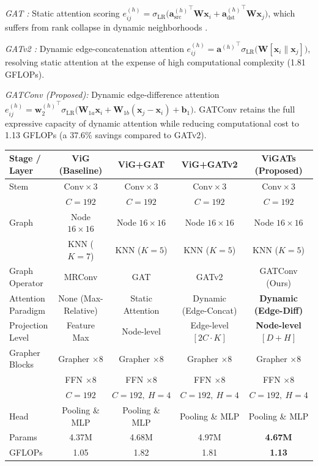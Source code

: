 \documentclass[]{interact}
\theoremstyle{plain}
\theoremstyle{definition}
\theoremstyle{remark}
\begin{document}
\textit{GAT \citep{velickovic2018graph}:} Static attention scoring $e_{ij}^{(h)} = \sigma_{\text{LR}}\!\Big({\mathbf{a}_{\text{src}}^{(h)}}^\top \mathbf{W}\mathbf{x}_i + {\mathbf{a}_{\text{dst}}^{(h)}}^\top \mathbf{W}\mathbf{x}_j\Big)$, which suffers from rank collapse in dynamic neighborhoods \citep{brody2022gat}.

\textit{GATv2 \citep{brody2022gat}:} Dynamic edge-concatenation attention $e_{ij}^{(h)} = {\mathbf{a}^{(h)}}^\top \sigma_{\text{LR}}\!\Big(\mathbf{W}[\mathbf{x}_i \parallel \mathbf{x}_j]\Big)$, resolving static attention at the expense of high computational complexity (1.81 GFLOPs).

\textit{GATConv (Proposed):} Dynamic edge-difference attention $e_{ij}^{(h)} = {\mathbf{w}_2^{(h)}}^\top \sigma_{\text{LR}}\!\Big(\mathbf{W}_{1a}\mathbf{x}_i + \mathbf{W}_{1b}(\mathbf{x}_j - \mathbf{x}_i) + \mathbf{b}_1\Big)$. GATConv retains the full expressive capacity of dynamic attention while reducing computational cost to 1.13 GFLOPs (a $37.6\%$ savings compared to GATv2).

\begin{table}[H]
\centering
\small
{}
{\begin{tabular}{lcccc} \toprule
\textbf{Stage / Layer} & \textbf{ViG (Baseline)} & \textbf{ViG+GAT} & \textbf{ViG+GATv2} & ViGATs (Proposed) \\ \midrule
Stem & $\text{Conv} \times 3$ & $\text{Conv} \times 3$ & $\text{Conv} \times 3$ & $\text{Conv} \times 3$ \\
     & $C = 192$ & $C = 192$ & $C = 192$ & $C = 192$ \\ \midrule
Graph & Node $16 \times 16$ & Node $16 \times 16$ & Node $16 \times 16$ & Node $16 \times 16$ \\
      & KNN ($K=7$) & KNN ($K=5$) & KNN ($K=5$) & KNN ($K=5$) \\ \midrule
Graph Operator & MRConv \citep{han2022vision} & GAT \citep{velickovic2018graph} & GATv2 \citep{brody2022gat} & GATConv (Ours) \\
Attention Paradigm & None (Max-Relative) & Static Attention & Dynamic (Edge-Concat) & \textbf{Dynamic (Edge-Diff)} \\
Projection Level & Feature Max & Node-level & Edge-level $[2C \cdot K]$ & \textbf{Node-level $[D+H]$} \\ \midrule
Grapher Blocks & Grapher $\times 8$ & Grapher $\times 8$ & Grapher $\times 8$ & Grapher $\times 8$ \\
               & FFN $\times 8$ & FFN $\times 8$ & FFN $\times 8$ & FFN $\times 8$ \\
               & $C = 192$ & $C = 192,\ H = 4$ & $C = 192,\ H = 4$ & $C = 192,\ H = 4$ \\ \midrule
Head & Pooling \& MLP & Pooling \& MLP & Pooling \& MLP & Pooling \& MLP \\ \midrule
Params & 4.37M & 4.68M & 4.97M & \textbf{4.67M} \\
GFLOPs & 1.05 & 1.82 & 1.81 & \textbf{1.13} \\ \bottomrule
\end{tabular}}
\label{tab:gnn_architectures}
\end{table}
\end{document}
